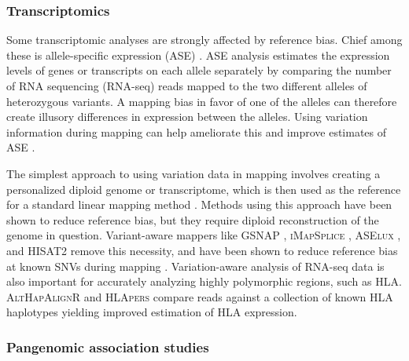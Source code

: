 \subsubsection{Transcriptomics}

Some transcriptomic analyses are strongly affected by reference bias.
Chief among these is allele-specific expression (ASE) \cite{Degner2009-vw,stevenson2013sources,Castel2015-ef}.
ASE analysis estimates the expression levels of genes or transcripts on each allele separately by comparing the number of RNA sequencing (RNA-seq) reads mapped to the two different alleles of heterozygous variants.
A mapping bias in favor of one of the alleles can therefore create illusory differences in expression between the alleles.
Using variation information during mapping can help ameliorate this and improve estimates of ASE \cite{Castel2015-ef,Miao2018-ps}.

The simplest approach to using variation data in mapping involves creating a personalized diploid genome or transcriptome, which is then used as the reference for a standard linear mapping method \cite{Rozowsky_2011,Raghupathy2018-sd}.
Methods using this approach have been shown to reduce reference bias, but they require diploid reconstruction of the genome in question.
Variant-aware mappers like \textsc{GSNAP} \cite{Wu2010-hv}, \textsc{iMapSplice} \cite{Liu_2018}, \textsc{ASElux} \cite{Miao2018-ps}, and \textsc{HISAT2} \cite{Kim_2019} remove this necessity, and have been shown to reduce reference bias at known SNVs during mapping \cite{Castel2015-ef,Liu_2018}.
Variation-aware analysis of RNA-seq data is also important for accurately analyzing highly polymorphic regions, such as HLA.
\textsc{AltHapAlignR} \cite{Lee_2018} and \textsc{HLApers} \cite{Aguiar2019-fy} compare reads against a collection of known HLA haplotypes yielding improved estimation of HLA expression.

\subsubsection{Pangenomic association studies}


